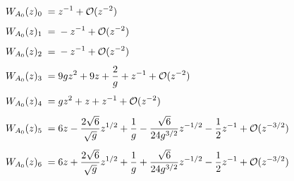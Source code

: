 \begin{sheetasymptotics}
    \begin{align*}
        \sheetlabel{W_{A_0}(z)_{0}} & ={}z^{-1}+\mathcal O(z^{-2}) \\[4pt]
        \sheetlabel{W_{A_0}(z)_{1}} & ={}-z^{-1}+\mathcal O(z^{-2}) \\[4pt]
        \sheetlabel{W_{A_0}(z)_{2}} & ={}-z^{-1}+\mathcal O(z^{-2}) \\[4pt]
        \sheetlabel{W_{A_0}(z)_{3}} & ={}9 gz^{2}+9z+\frac{2}{g}+z^{-1}+\mathcal O(z^{-2}) \\[4pt]
        \sheetlabel{W_{A_0}(z)_{4}} & ={}gz^{2}+z+z^{-1}+\mathcal O(z^{-2}) \\[4pt]
        \sheetlabel{W_{A_0}(z)_{5}} & ={}6z-\frac{2 \sqrt{6}}{\sqrt{g}}z^{1/2}+\frac{1}{g}-\frac{\sqrt{6}}{24 g^{3/2}}z^{-1/2}-\frac{1}{2}z^{-1}+\mathcal O(z^{-3/2}) \\[4pt]
        \sheetlabel{W_{A_0}(z)_{6}} & ={}6z+\frac{2 \sqrt{6}}{\sqrt{g}}z^{1/2}+\frac{1}{g}+\frac{\sqrt{6}}{24 g^{3/2}}z^{-1/2}-\frac{1}{2}z^{-1}+\mathcal O(z^{-3/2})
    \end{align*}
\end{sheetasymptotics}
